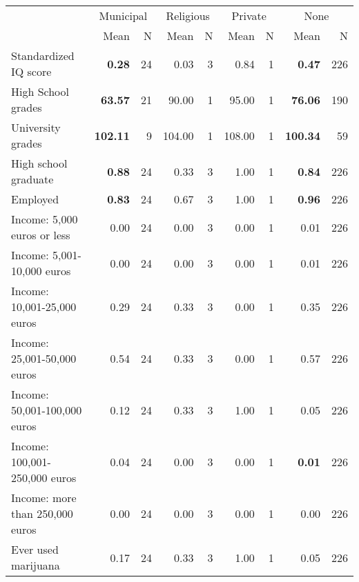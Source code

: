 \begin{tabular}{l r r r r r r r r}
\toprule
& \multicolumn{2}{c}{Municipal} & \multicolumn{2}{c}{Religious} & \multicolumn{2}{c}{Private} & \multicolumn{2}{c}{None} \\
& \scriptsize Mean & \scriptsize N & \scriptsize Mean & \scriptsize N & \scriptsize Mean & \scriptsize N & \scriptsize Mean & \scriptsize N \\
\midrule
Standardized IQ score & \textbf{     0.28} &        24 &      0.03 &         3 &      0.84 &         1 & \textbf{     0.47} &       226 \\
High School grades & \textbf{    63.57} &        21 &     90.00 &         1 &     95.00 &         1 & \textbf{    76.06} &       190 \\
University grades & \textbf{   102.11} &         9 &    104.00 &         1 &    108.00 &         1 & \textbf{   100.34} &        59 \\
High school graduate & \textbf{     0.88} &        24 &      0.33 &         3 &      1.00 &         1 & \textbf{     0.84} &       226 \\
Employed & \textbf{     0.83} &        24 &      0.67 &         3 &      1.00 &         1 & \textbf{     0.96} &       226 \\
Income: 5,000 euros or less &      0.00 &        24 &      0.00 &         3 &      0.00 &         1 &      0.01 &       226 \\
Income: 5,001-10,000 euros &      0.00 &        24 &      0.00 &         3 &      0.00 &         1 &      0.01 &       226 \\
Income: 10,001-25,000 euros &      0.29 &        24 &      0.33 &         3 &      0.00 &         1 &      0.35 &       226 \\
Income: 25,001-50,000 euros &      0.54 &        24 &      0.33 &         3 &      0.00 &         1 &      0.57 &       226 \\
Income: 50,001-100,000 euros &      0.12 &        24 &      0.33 &         3 &      1.00 &         1 &      0.05 &       226 \\
Income: 100,001-250,000 euros &      0.04 &        24 &      0.00 &         3 &      0.00 &         1 & \textbf{     0.01} &       226 \\
Income: more than 250,000 euros &      0.00 &        24 &      0.00 &         3 &      0.00 &         1 &      0.00 &       226 \\
Ever used marijuana &      0.17 &        24 &      0.33 &         3 &      1.00 &         1 &      0.05 &       226 \\

\end{tabular}
